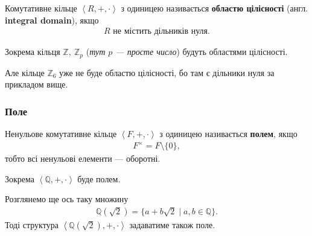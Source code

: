 \documentclass{math_library}
\begin{document}
\begin{definition}
Комутативне кільце $\left<R,+,\cdot \right>$ з одиницею називається \textbf{областю цілісності} (англ. \textbf{integral domain}), якщо
\begin{align*}
R \text{ не містить дільників нуля.}
\end{align*}
\end{definition}

\begin{example}
Зокрема кільця $\mathbb{Z},\ \mathbb{Z}_p$ (\textit{тут $p$ --- просте число}) будуть областями цілісності.
\end{example}

\begin{example}
Але кільце $\mathbb{Z}_6$ уже не буде областю цілісності, бо там є дільники нуля за прикладом вище.
\end{example}

\subsubsection{Поле}
\begin{definition}
Ненульове комутативне кільце $\left<F,+,\cdot \right>$ з одиницею називається \textbf{полем}, якщо
\begin{align*}
F^\times = F \setminus \{0\},
\end{align*}
тобто всі ненульові елементи --- оборотні.
\end{definition}

\begin{example}
Зокрема $\left<\mathbb{Q},+,\cdot \right>$ буде полем.
\end{example}

\begin{example}
Розглянемо ще ось таку множину
\begin{align*}
\mathbb{Q}(\sqrt{2}) = \{a + b \sqrt{2} \mid a,b \in \mathbb{Q}\}.
\end{align*}
Тоді структура $\left< \mathbb{Q}(\sqrt{2}), +, \cdot \right>$ задаватиме також поле.
\end{example}
\end{document}
